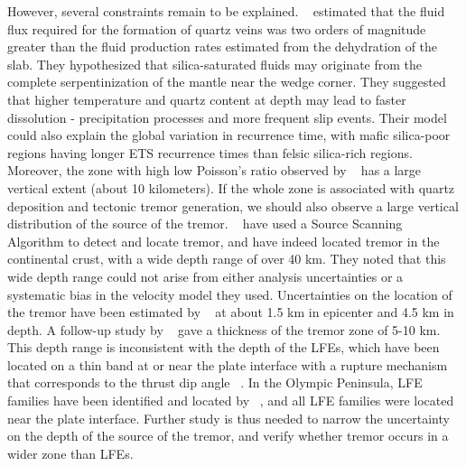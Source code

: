 \documentclass[draft]{agujournal2019}
\begin{document}
However, several constraints remain to be explained. ~ estimated that the fluid flux required for the formation of quartz veins was two orders of magnitude greater than the fluid production rates estimated from the dehydration of the slab. They hypothesized that silica-saturated fluids may originate from the complete serpentinization of the mantle near the wedge corner. They suggested that higher temperature and quartz content at depth may lead to faster dissolution - precipitation processes and more frequent slip events. Their model could also explain the global variation in recurrence time, with mafic silica-poor regions having longer ETS recurrence times than felsic silica-rich regions. \\

Moreover, the zone with high low Poisson's ratio observed by ~ has a large vertical extent (about 10 kilometers). If the whole zone is associated with quartz deposition and tectonic tremor generation, we should also observe a large vertical distribution of the source of the tremor. ~ have used a Source Scanning Algorithm to detect and locate tremor, and have indeed located tremor in the continental crust, with a wide depth range of over 40 km. They noted that this wide depth range could not arise from either analysis uncertainties or a systematic bias in the velocity model they used. Uncertainties on the location of the tremor have been estimated by  ~ at about 1.5 km in epicenter and 4.5 km in depth. A follow-up study by ~ gave a thickness of the tremor zone of 5-10 km. This depth range is inconsistent with the depth of the LFEs, which have been located on a thin band at or near the plate interface with a rupture mechanism that corresponds to the thrust dip angle ~\cite{IDE_2007_GRL}. In the Olympic Peninsula, LFE families have been identified and located by ~, and all LFE families were located near the plate interface. Further study is thus needed to narrow the uncertainty on the depth of the source of the tremor, and verify whether tremor occurs in a wider zone than LFEs. \\
\end{document}
